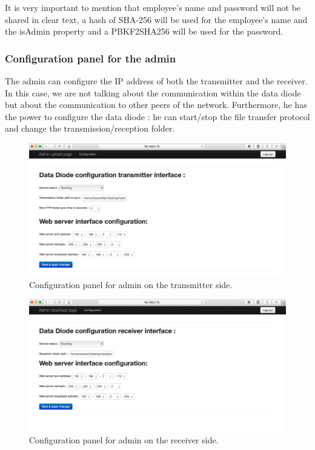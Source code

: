 \documentclass[a4paper,10pt]{article}
\begin{document}
It is very important to mention that employee's name and password will not be shared in clear text, a hash of SHA-256 will be used for the employee's name and the isAdmin property and a PBKF2SHA256 will be used for the password.

\subsubsection{Configuration panel for the admin}
The admin can configure the IP address of both the transmitter and the receiver. In this case, we are not talking about the communication within the data diode but about the communication to other peers of the network. Furthermore, he has the power to configure the data diode : he can start/stop the file transfer protocol and change the transmission/reception folder.

\begin{figure}[!h]
\centering
\includegraphics[scale=0.35]{images/admin-configTrans.png}
\caption{Configuration panel for admin on the transmitter side.}
\label{fig:configadminpagetrans}
\end{figure}
\bigskip
\begin{figure}[!h]
\centering
\includegraphics[scale=0.35]{images/admin-configReceiv.png}
\caption{Configuration panel for admin on the receiver side.}
\label{fig:configadminpagereceiv}
\end{figure}
\end{document}
